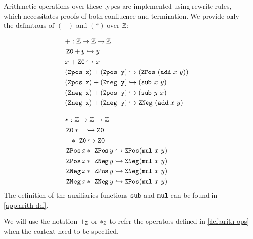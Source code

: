 \begin{definition}\label{def:arith-ops}
Arithmetic operations over these types are implemented using rewrite rules, which necessitates proofs of both confluence and termination.
We provide only the definitions of $(+)$ and $(*)$ over $\Z$:

\begin{align*}
&+: \bb{Z} \ra \bb{Z} \ra \bb{Z} \\
& \ZO +\, y \re y \\
& x + \ZO \re x \\
& (\tt{Zpos x}) + (\tt{Zpos y}) \re (\ZPos~(\tt{add}~x~y))  \\
& (\tt{Zpos x}) + (\tt{Zneg y}) \re (\tt{sub}~x~y)  \\
& (\tt{Zneg x}) + (\tt{Zpos y}) \re (\tt{sub}~y~x)  \\
& (\tt{Zneg x}) + (\tt{Zneg y}) \re \ZNeg~(\tt{add}~x~y)\\[1em]
&\tt{*} : \bb{Z} \ra \bb{Z} \ra \bb{Z} \\
& \ZO *~\_ \re \ZO \\
& \_ *~\ZO \re \ZO \\
& \ZPos x *~\ZPos y \re \ZPos (\tt{mul}~x~y) \\
& \ZPos x *~\ZNeg    y \re \ZNeg    (\tt{mul}~x~y) \\
& \ZNeg    x *~\ZPos y \re \ZNeg    (\tt{mul}~x~y) \\
& \ZNeg    x *~\ZNeg    y \re \ZPos (\tt{mul}~x~y) \\
\end{align*}
The definition of the auxiliaries functions $\kw{sub}$ and $\kw{mul}$ can be found in \cref{app:arith-def}.
\end{definition}

\begin{notation}
We will use the notation $+_\Z$ or $*_\Z$ to refer the operators defined in \cref{def:arith-ops} when the context need to be specified.
\end{notation}

